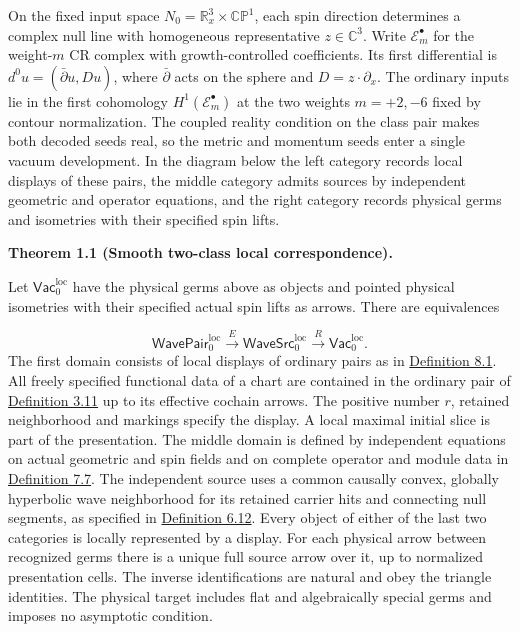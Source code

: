 \documentclass[
  english,
  11pt,
  reqno]{amsart}
\makeatletter
\newcommand{\pandocstatementheading}[1]{%
  \par\addpenalty{\@beginparpenalty}%
  \addvspace{.5\baselineskip plus .2\baselineskip minus .2\baselineskip}%
  {\normalfont\bfseries #1\par}%
  \nobreak\@afterindenttrue\@afterheading
}
\makeatother
\begin{document}
On the fixed input space \(N_0=\mathbb R^3_x\times\mathbb{CP}^1\), each
spin direction determines a complex null line with homogeneous
representative \(z\in\mathbb C^3\). Write \(\mathscr E_m^\bullet\) for
the weight-\(m\) CR complex with growth-controlled coefficients. Its
first differential is \(d^0u=(\bar\partial u,Du)\), where
\(\bar\partial\) acts on the sphere and \(D=z\cdot\partial_x\). The
ordinary inputs lie in the first cohomology
\(H^1(\mathscr E_m^\bullet)\) at the two weights \(m=+2,-6\) fixed by
contour normalization. The coupled reality condition on the class pair
makes both decoded seeds real, so the metric and momentum seeds enter a
single vacuum development. In the diagram below the left category
records local displays of these pairs, the middle category admits
sources by independent geometric and operator equations, and the right
category records physical germs and isometries with their specified spin
lifts.

\pandocstatementheading{\leavevmode{}\label{thm:local-main-correspondence}Theorem 1.1 (Smooth two-class local correspondence).}

Let \(\mathsf{Vac}^{\mathrm{loc}}_0\) have the physical germs above as
objects and pointed physical isometries with their specified actual spin
lifts as arrows. There are equivalences

\label{eq:main-smooth-two-class-correspondence} \[
\mathsf{WavePair}^{\mathrm{loc}}_0
\xrightarrow{\ E\ }
\mathsf{WaveSrc}^{\mathrm{loc}}_0
\xrightarrow{\ R\ }
\mathsf{Vac}^{\mathrm{loc}}_0 .
\] The first domain consists of local displays of ordinary pairs as in
\hyperref[def:local-display-groupoids]{Definition 8.1}. All freely
specified functional data of a chart are contained in the ordinary pair
of \hyperref[def:online-effective-ordinary-cochain-domain]{Definition
3.11} up to its effective cochain arrows. The positive number \(r\),
retained neighborhood and markings specify the display. A local maximal
initial slice is part of the presentation. The middle domain is defined
by independent equations on actual geometric and spin fields and on
complete operator and module data in
\hyperref[def:online-complete-independent-wave-source]{Definition 7.7}.
The independent source uses a common causally convex, globally
hyperbolic wave neighborhood for its retained carrier hits and
connecting null segments, as specified in
\hyperref[def:online-wave-carrier-displays]{Definition 6.12}. Every
object of either of the last two categories is locally represented by a
display. For each physical arrow between recognized germs there is a
unique full source arrow over it, up to normalized presentation cells.
The inverse identifications are natural and obey the triangle
identities. The physical target includes flat and algebraically special
germs and imposes no asymptotic condition.
\end{document}
